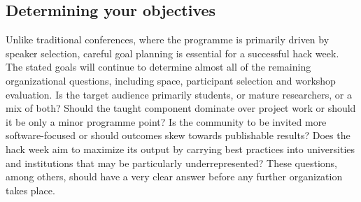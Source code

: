 \documentclass{aastex62}
\begin{document}
\subsection{Determining your objectives}

Unlike traditional conferences, where the programme is primarily driven by speaker selection, careful goal planning is essential for a successful hack week. The stated goals will continue to determine almost all of the remaining organizational questions, including space, participant selection and workshop evaluation. Is the target audience primarily students, or mature researchers, or a mix of both? Should the taught component dominate over project work or should it be only a minor programme point? Is the community to be invited more software-focused or should outcomes skew towards publishable results? Does the hack week aim to maximize its output by carrying best practices into universities and institutions that may be particularly underrepresented? These questions, among others, should have a very clear answer before any further organization takes place.
\end{document}
